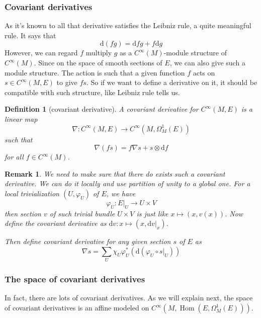 \documentclass[11pt]{amsart}
\numberwithin{equation}{section}
\theoremstyle{plain}
\theoremstyle{plain}
\newtheorem{defnsub}[thmsub]{Definition}
\newtheorem{remksub}[thmsub]{Remark}
\numberwithin{equation}{section}
\begin{document}
\subsubsection{Covariant derivatives}
As it's known to all that derivative satisfies the Leibniz rule, a quite meaningful rule. It says that
$$
\mathrm{d}(fg)=\mathrm{d}fg+f\mathrm{d}g
$$
However, we can regard $f$ multiply $g$ as a $C^{\infty}(M)$-module structure of $C^{\infty}(M)$. Since on the space of smooth sections of $E$, we can also give such a module structure. The action is such that a given function $f$ acts on $s\in C^{\infty}(M,E)$ to give $fs$. So if we want to define a derivative on it, it should be compatible with such structure, like Leibniz rule tells us.
\begin{defnsub}[covariant derivative]
A covariant derivative for $C^{\infty}(M,E)$ is a linear map
$$
\nabla:C^{\infty}(M,E)\to C^{\infty}(M,\Omega_M^1(E))
$$
such that 
$$
\nabla(fs)=f\nabla s+s\otimes\mathrm{d}f
$$
for all $f\in C^{\infty}(M)$.
\end{defnsub}
\begin{remksub}\normalfont
We need to make sure that there do exists such a covariant derivative. We can do it locally and use partition of unity to a global one. For a local trivialization $(U,\varphi_U)$ of $E$, we have 
$$
\varphi_U:E|_U\to U\times V
$$
then section $v$ of such trivial bundle $U\times V$ is just like $x\mapsto (x,v(x))$. Now define the covariant derivative as $\mathrm{d}v:x\mapsto(x,\mathrm{d}v|_x)$.

Then define covariant derivative for any given section $s$ of $E$ as 
$$
\nabla s=\sum_{U}\chi_U\varphi_{U}^*(\mathrm{d}(\varphi_U\circ s|_U))
$$
\end{remksub}

\subsubsection{The space of covariant derivatives}
In fact, there are lots of covariant derivatives. As we will explain next, the space of covariant derivatives is an affine modeled on $C^{\infty}(M,\operatorname{Hom}(E,\Omega_M^1(E)))$.
\end{document}
